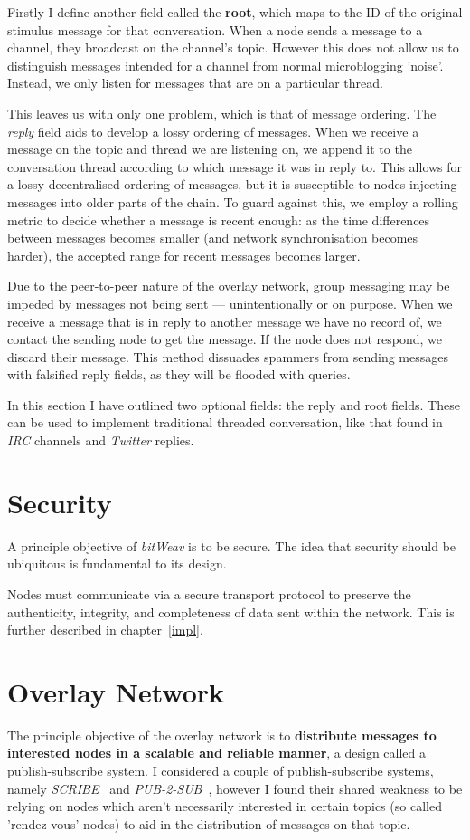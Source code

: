 \documentclass[10pt,a4paper,onecolumn]{article}
\begin{document}
Firstly I define another field called the \textbf{root}, which maps to the ID of the original stimulus message for that conversation. When a node sends a message to a channel, they broadcast on the channel's topic. However this does not allow us to distinguish messages intended for a channel from normal microblogging 'noise'. Instead, we only listen for messages that are on a particular thread. 

This leaves us with only one problem, which is that of message ordering. The \emph{reply} field aids to develop a lossy ordering of messages. When we receive a message on the topic and thread we are listening on, we append it to the conversation thread according to which message it was in reply to. This allows for a lossy decentralised ordering of messages, but it is susceptible to nodes injecting messages into older parts of the chain. To guard against this, we employ a rolling metric to decide whether a message is recent enough: as the time differences between messages becomes smaller (and network synchronisation becomes harder), the accepted range for recent messages becomes larger. 

Due to the peer-to-peer nature of the overlay network, group messaging may be impeded by messages not being sent — unintentionally or on purpose. When we receive a message that is in reply to another message we have no record of, we contact the sending node to get the message. If the node does not respond, we discard their message. This method dissuades spammers from sending messages with falsified reply fields, as they will be flooded with queries. 

In this section I have outlined two optional fields: the reply and root fields. These  can be used to implement traditional threaded conversation, like that found in \textit{IRC} channels and \textit{Twitter} replies.

\section{Security}
\label{security}
A principle objective of \textit{bitWeav} is to be secure. The idea that security should be ubiquitous is fundamental to its design.

Nodes must communicate via a secure transport protocol to preserve the authenticity, integrity, and completeness of data sent within the network. This is further described in chapter~\ref{impl}.

\section{Overlay Network}
\label{network}
The principle objective of the overlay network is to \textbf{distribute messages to interested nodes in a scalable and reliable manner}, a design called a publish-subscribe system. I considered a couple of publish-subscribe systems, namely \textit{SCRIBE}~\cite{castro2002scribe} and \textit{PUB-2-SUB}~\cite{pub2sub}, however I found their shared weakness to be relying on nodes which aren't necessarily interested in certain topics (so called 'rendez-vous' nodes) to aid in the distribution of messages on that topic.
\end{document}
